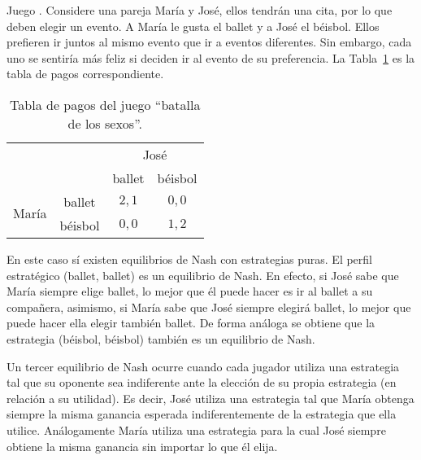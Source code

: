 \begin{example}
\label{ex:batalla-sexos}
Juego . Considere una pareja María y José, ellos tendrán una cita, por lo que deben elegir un evento. A María le gusta el ballet y a José el béisbol. Ellos prefieren ir juntos al mismo evento que ir a eventos diferentes. Sin embargo, cada uno se sentiría más feliz si deciden ir al evento de su preferencia. La Tabla~\ref{table:pagos-batallas-sexo} es la tabla de pagos correspondiente.
\end{example}

\begin{table}[h]
\begin{center}
\caption{Tabla de pagos del juego ``batalla de los sexos''.}
\label{table:pagos-batallas-sexo}
\begin{tabular}{ c c | c | c |}
 & \multicolumn{1}{c}{} & \multicolumn{2}{c}{José} \\
 & \multicolumn{1}{c}{} & \multicolumn{1}{c}{ballet} & \multicolumn{1}{c}{béisbol}  \\ \cline{3-4}
 \multirow{2}{*}{María}
 & ballet  & $2, 1$ & $0, 0$ \\ \cline{3-4}
 & béisbol & $0, 0$ & $1, 2$ \\ \cline{3-4}
\end{tabular}
\end{center}
\end{table}

En este caso sí existen equilibrios de Nash con estrategias puras. El perfil estratégico (ballet, ballet) es un equilibrio de Nash. En efecto, si José sabe que María siempre elige ballet, lo mejor que él puede hacer es ir al ballet a su compañera, asimismo, si María sabe que José siempre elegirá ballet, lo mejor que puede hacer ella elegir también ballet. De forma análoga se obtiene que la estrategia (béisbol, béisbol) también es un equilibrio de Nash.

Un tercer equilibrio de Nash ocurre cuando cada jugador utiliza una estrategia tal que su oponente sea indiferente ante la elección de su propia estrategia (en relación a su utilidad). Es decir, José utiliza una estrategia tal que María obtenga siempre la misma ganancia esperada indiferentemente de la estrategia que ella utilice. Análogamente María utiliza una estrategia para la cual José siempre obtiene la misma ganancia sin importar lo que él elija.

